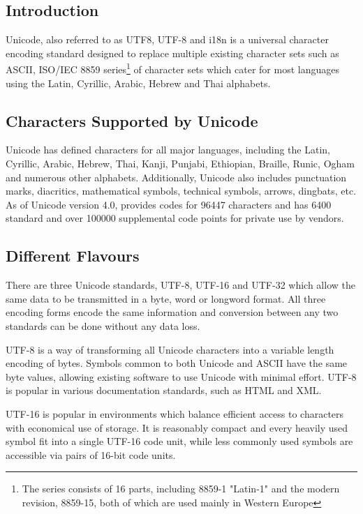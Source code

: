 
\subsection{Introduction}

Unicode, also referred to as UTF8, UTF-8 and i18n is a universal
character encoding standard designed to replace multiple existing
character sets such as ASCII, 
ISO/IEC 8859 series\footnote{The series consists of 16 parts, including 8859-1 "Latin-1" and the modern revision, 8859-15, both of which are used mainly in Western Europe}
of character sets which cater for most languages using the Latin, 
Cyrillic, Arabic, Hebrew and Thai alphabets.

\subsection{Characters Supported by Unicode}

Unicode has defined characters for all major languages, including the
Latin, Cyrillic, Arabic, Hebrew, Thai, Kanji, Punjabi, Ethiopian, 
Braille, Runic, Ogham and numerous other alphabets. Additionally,
Unicode also includes punctuation marks, diacritics, mathematical
symbols, technical symbols, arrows, dingbats, etc. As of Unicode version
4.0, provides codes for 96447 characters and has 6400 standard and over
100000 supplemental code points for private use by vendors.

\subsection{Different Flavours}

There are three Unicode standards, UTF-8, UTF-16 and UTF-32 which allow 
the same data to be transmitted in a byte, word or longword format. All
three encoding forms encode the same information and conversion between
any two standards can be done without any data loss.


UTF-8 is a way of transforming all Unicode characters into a variable
length encoding of bytes. Symbols common to both Unicode and ASCII have
the same byte values, allowing existing software to use Unicode with
minimal effort. UTF-8 is popular in various documentation standards, 
such as HTML and XML.


UTF-16 is popular in environments which balance efficient access to
characters with economical use of storage. It is reasonably compact and
every heavily used symbol fit into a single UTF-16 code unit, while
less commonly used symbols are accessible via pairs of 16-bit code
units.


